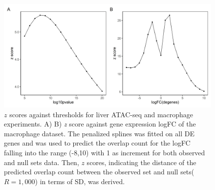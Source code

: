 \documentclass{article}
\begin{document}
\begin{figure}[htbp]
\centering
\includegraphics[scale=0.3]{Figures/zscore.jpeg}
\caption{
  $z$ scores against thresholds for liver ATAC-seq and macrophage experiments.
  A)   B) \textit{z} score against gene expression logFC of the
  macrophage dataset. The penalized splines was fitted on all DE genes and was used to predict the overlap count for the logFC falling into the range (-8,10) with 1 as increment for both observed and null sets data. Then, $z$ scores, indicating the distance of the predicted overlap count between the observed set and
null sets($R = 1,000$) in terms of SD, was derived.}
\label{fig:suppfig2}
\end{figure}
\end{document}
